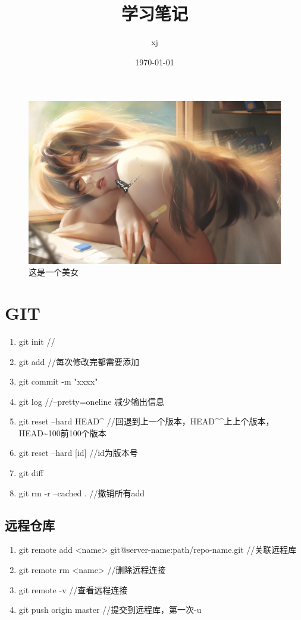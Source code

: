 \documentclass[fontset=windows]{article}
\title{学习笔记}
\author{xj}
\date{\today}
\begin{document}
\graphicspath{{figures/}} %
\maketitle
\tableofcontents %
\clearpage

\begin{figure}
\centering
\includegraphics[width=\textwidth]{美女.png}
\caption{这是一个美女}
\label{fig:beauty} %
\end{figure}
\clearpage  %
\section{GIT} \label{sec:GIT}
\begin{enumerate}
    \item git init //
    \item git add  //每次修改完都需要添加
    \item git commit -m "xxxx"
    \item git log //--pretty=oneline 减少输出信息
    \item git reset --hard HEAD\^{} //回退到上一个版本，HEAD\^{}\^{}上上个版本，HEAD\~{}100前100个版本
    \item git reset --hard [id]  //id为版本号
    \item git diff 
    \item git rm -r --cached . //撤销所有add

\end{enumerate}

\subsection{远程仓库}\label{sec:remote_repo}
\begin{enumerate}
    \item git remote add <name> git@server-name:path/repo-name.git //关联远程库
    \item git remote rm <name> //删除远程连接
    \item git remote -v //查看远程连接
    \item git push origin master //提交到远程库，第一次-u
\end{enumerate}
\end{document}
